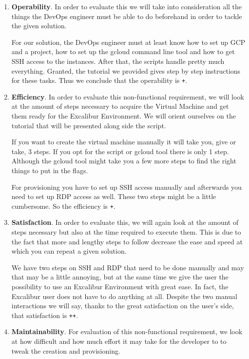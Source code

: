\begin{enumerate}

	\item \textbf{Operability}.  In order to evaluate
	this we will take into consideration all the things the DevOps
	engineer must be able to do beforehand in order to tackle the
	given solution.

	For our solution, the DevOps engineer must at least know how to
	set up GCP and a project, how to set up the gcloud command line
	tool and how to get SSH access to the instances. After that, the
	scripts handle pretty much everything. Granted, the tutorial we
	provided gives step by step instructions for these tasks. Thus we
	conclude that the operability is \verb|+|.

	\item \textbf{Efficiency}. In order to evaluate
	this non-functional requirement, we will look at the amount of
	steps necessary to acquire the Virtual Machine and get them ready
	for the Excalibur Environment. We will orient ourselves on the
	tutorial that will be presented along side the script.

	If you want to create the virtual machine manually it will take
	you, give or take, 3 steps. If you opt for the script or gcloud
	tool there is only 1 step. Although the gcloud tool might take you
	a few more steps to find the right things to put in the flags.

	For provisioning you have to set up SSH access manually and
	afterwards you need to set up RDP access as well. These two steps
	might be a little cumbersome. So the efficiency is \verb|+|.

	\item \textbf{Satisfaction}.  In order to evaluate
	this, we will again look at the amount of steps necessary but also
	at the time required to execute them.  This is due to the fact
	that more and lengthy steps to follow decrease the ease and speed
	at which you can repeat a given solution.

	We have two steps on SSH and RDP that need to be done manually and
	may that may be a little annoying, but at the same time we give
	the user the possibility to use an Excalibur Environment with
	great ease. In fact, the Excalibur user does not have to do
	anything at all. Despite the two manual interactions we will say,
	thanks to the great satisfaction on the user's side, that
	satisfaction is \verb|++|.

	\item \textbf{Maintainability}.  For evaluation of
	this non-functional requirement, we look at how difficult and how
	much effort it may take for the developer to to tweak the creation
	and provisioning.


\end{enumerate}
